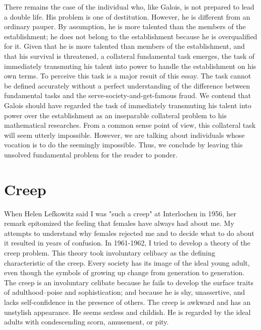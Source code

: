 \documentclass[10pt,twoside,draft]{memoir}
\begin{document}
{{{There remains the case of the individual who, like Galois, is not 
prepared to lead a double life. His problem is one of destitution. However, 
he is different from an ordinary pauper. By assumption, he is more talented 
than the members of the establishment; he does not belong to the 
establishment because he is overqualified for it. Given that he is more 
talented than members of the establishment, and that his survival is 
threatened, a collateral fundamental task emerges, the task of immediately 
transmuting his talent into power to handle the establishment on his own 
terms. To perceive this task is a major resuit of this essay. The task cannot be 
defined accurately without a perfect understanding of the difference 
between fundamental tasks and the serve-society-and-get-famous fraud. We 
contend that Galois should have regarded the task of immediately 
transmuting his talent into power over the establishment as an inseparable 
collateral problem to his mathematical researches. From a common sense 
point of view, this collateral task will seem utterly impossible. However, we 
are talking about individuals whose vocation is to do the seemingly 
impossible. Thus, we conclude by leaving this unsolved fundamental problem 
for the reader to ponder. 

\chapter{Creep}


When Helen Lefkowitz said I was "such a creep" at Interlochen in 
1956, her remark epitomized the feeling that females have always had about 
me. My attempts to understand why females rejected me and to decide what 
to do about it resulted in years of confusion. In 1961-1962, I tried to 
develop a theory of the creep problem. This theory took involuntary 
celibacy as the defining characteristic of the creep. Every society has its 
image of the ideal young adult, even though the symbols of growing up 
change from generation to generation. The creep is an involuntary celibate 
because he fails to develop the surface traits of adulthood--poise and 
sophistication; and because he is shy, unassertive, and lacks self-confidence 
in the presence of others. The creep is awkward and has an unstylish 
appearance. He seems sexless and childish. He is regarded by the ideal adults 
with condescending scorn, amusement, or pity. 

}}}
\end{document}
